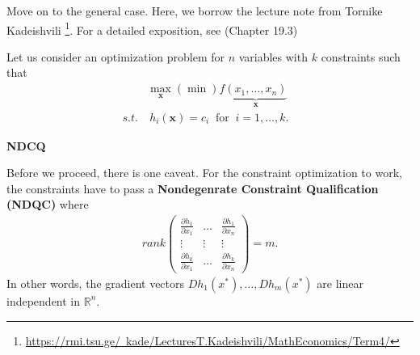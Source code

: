 \documentclass[10pt,a4paper]{book}
\theoremstyle{definition}\newtheorem{definition}{Definition}
\theoremstyle{definition}\newtheorem{fact}{Fact}
\theoremstyle{definition}\newtheorem{ex}{Ex.}
\theoremstyle{definition}\newtheorem{project}{Project}
\theoremstyle{definition}\newtheorem{problem}{Problem}
\theoremstyle{definition}\newtheorem{example}{Example}
\numberwithin{theorem}{chapter}
\numberwithin{corollary}{chapter}
\numberwithin{assumption}{chapter}
\numberwithin{definition}{chapter}
\numberwithin{prop}{chapter}
\numberwithin{notation}{chapter}
\numberwithin{problem}{chapter}
\numberwithin{example}{chapter}
\numberwithin{fact}{chapter}
\numberwithin{ex}{chapter}
\def\R{\mathbb R}
\def\R{\mathbb R}
\def\x{\mathbf x}
\begin{document}
	Move on to the general case. Here, we borrow the lecture note from Tornike Kadeishvili \footnote{\href{https://rmi.tsu.ge/~kade/LecturesT.Kadeishvili/MathEconomics/Term4/}{https://rmi.tsu.ge/~kade/LecturesT.Kadeishvili/MathEconomics/Term4/}}. For a detailed exposition, see \cite{simon1994mathematics} (Chapter 19.3)
	
	Let us consider an optimization problem for $n$ variables with $k$ constraints such that
	\begin{align*}
		& \max_{\x} (\min) f \underbrace{(x_1, \dots, x_n)}_{\x} \\
		s.t. &\ h_i (\x) = c_i \ \text{ for } \ i = 1, \dots, k. &                                                        
	\end{align*}
	
	\textbf{NDCQ}
	
	Before we proceed, there is one caveat. For the constraint optimization to work, the constraints have to pass a \textbf{Nondegenrate Constraint Qualification (NDQC)} where
	\begin{align*}
		rank \begin{pmatrix}
			\frac{\partial h_1}{\partial x_1} & \dots & \frac{\partial h_1}{\partial x_n} \\
			\vdots & \vdots & \vdots \\
			\frac{\partial h_k}{\partial x_1} & \dots & \frac{\partial h_k}{\partial x_n}
		\end{pmatrix} = m.
	\end{align*}
	In other words, the gradient vectors $D h_1 (x^*), \dots, D h_m(x^*)$ are linear independent in $\R^n$.
	
\end{document}
